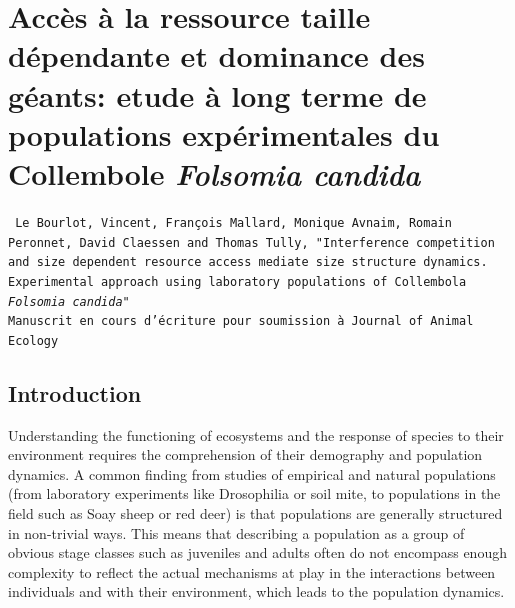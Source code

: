 \chapter{Accès à la ressource taille
dépendante et dominance des géants: etude à long terme de populations
expérimentales du Collembole \textit{Folsomia candida}}\label{Ann:SP}

\vspace{2cm}

\begin{Spacing}{1}
\texttt{
Le Bourlot, Vincent, François Mallard, Monique Avnaim, Romain Peronnet, David
Claessen and Thomas Tully, "Interference competition and size dependent resource
access mediate size structure dynamics. Experimental approach using laboratory
populations of Collembola \textit{Folsomia candida}"\\
Manuscrit en cours d'écriture pour soumission à Journal of Animal Ecology}
\end{Spacing}


\section{Introduction}

Understanding the functioning of ecosystems and the response of species to their
environment requires the comprehension of their demography and population
dynamics. A common finding from studies of empirical and natural populations
(from laboratory experiments like Drosophilia  or soil mite, to populations in
the field such as Soay sheep  or red deer) is that populations are generally
structured in non-trivial ways.
This means that describing a population as a group of obvious stage classes such
as juveniles and adults often do not encompass enough complexity to reflect the
actual mechanisms at play in the interactions between individuals and with their
environment, which leads to the population dynamics.

